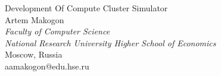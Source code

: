 \documentclass[a4paper,10pt]{article}
\begin{document}
\begin{center}
    {
        \huge 
            Development Of Compute Cluster Simulator
    }
    \\[0.5cm]
    { \large
        Artem Makogon \\
\textit{Faculty of Computer Science} \\ 
\textit{National Research University Higher School of Economics} \\ 
Moscow, Russia \\
aamakogon@edu.hse.ru
    }
\end{center}

\vspace{0.5cm}


\setlength{\columnsep}{15pt}
\end{document}
